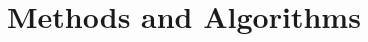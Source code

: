 \documentclass{article}
\begin{document}


% 
% 
% 
% 
% 
% 
% 
% 
% 
% 
% 

\section {Methods and Algorithms}
 
\end{document}
